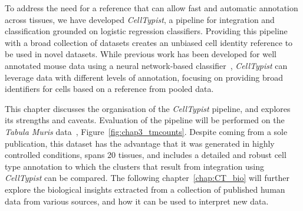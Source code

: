 To address the need for a reference that can allow fast and automatic annotation across tissues, we have developed \textit{CellTypist}, a pipeline for integration and classification grounded on logistic regression classifiers. Providing this pipeline with a broad collection of datasets creates an unbiased cell identity reference to be used in novel datasets. While previous work has been developed for well annotated mouse data  using a neural network-based classifier~\citep{alavi_web_2018}, \textit{CellTypist} can leverage data with different levels of annotation, focusing on providing broad identifiers for cells based on a reference from pooled data.

This chapter discusses the organisation of the \textit{CellTypist} pipeline, and explores its strengths and caveats. Evaluation of the pipeline will be performed on the \textit{Tabula Muris} data~\citep{noauthor_single-cell_2018}, Figure~\ref{fig:chap3_tmcounts}. Despite coming from a sole publication, this dataset has the advantage that it was generated in highly controlled conditions, spans 20 tissues, and includes a detailed and robust cell type annotation to which the clusters that result from integration using \textit{CellTypist} can be compared. The following chapter~\ref{chap:CT_bio} will further explore the biological insights extracted from a collection of published human data from various sources, and how it can be used to interpret new data.

